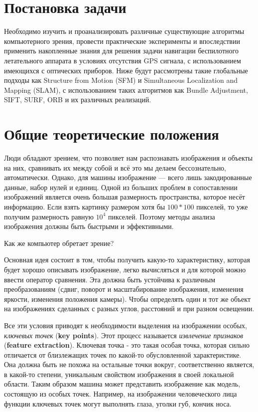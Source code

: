 \section{Постановка задачи}

Необходимо изучить и проанализировать различные существующие алгоритмы компьютерного зрения, провести практические эксперименты и впоследствии применить накопленные знания для решения задачи навигации беспилотного летательного аппарата в условиях отсутствия GPS сигнала, с использованием имеющихся с оптических приборов. Ниже будут рассмотрены такие глобальные подходы как Structure from Motion (SFM) и Simultaneous Localization and Mapping (SLAM), с использованием таких алгоритмов как Bundle Adjustment, SIFT, SURF, ORB и их различных реализаций.

\section{Общие теоретические положения}

Люди обладают зрением, что позволяет нам распознавать изображения и объекты на них, сравнивать их между собой и всё это мы делаем бессознательно, автоматически. Однако, для машины изображение — всего лишь закодированные данные, набор нулей и единиц. Одной из больших проблем в сопоставлении изображений является очень большая размерность пространства, которое несёт информацию. Если взять картинку размером хотя бы $100*100$ пикселей, то уже получим размерность равную $10^4$ пикселей. Поэтому методы анализа изображения должны быть быстрыми и эффективными.

Как же компьютер обретает зрение?

Основная идея состоит в том, чтобы получить какую-то характеристику, которая будет хорошо описывать изображение, легко вычисляться и для которой можно ввести оператор сравнения. Эта  должна быть устойчива к различным преобразованиям (сдвиг, поворот и масштабирование изображения, изменения яркости, изменения положения камеры). Чтобы определять один и тот же объект на изображениях сделанных с разных углов, расстояний и при разном освещении.

Все эти условия приводят к необходимости выделения на изображении особых, \textit{ключевых точек} (\textbf{key points}). Этот процесс называется \textit{извлечение признаков} (\textbf{feature extraction}). Ключевая точка - это такая особая точка, которая сильно отличается от близлежащих точек по какой-то обусловленной характеристике. Она должна быть не похожа на остальные точки вокруг, соответственно является, в какой-то степени, уникальным свойством изображения в своей локальной области. Таким образом машина может представить изображение как модель, состоящую из особых точек. Например, на изображении человеческого лица функции ключевых точек могут выполнять глаза, уголки губ, кончик носа.

